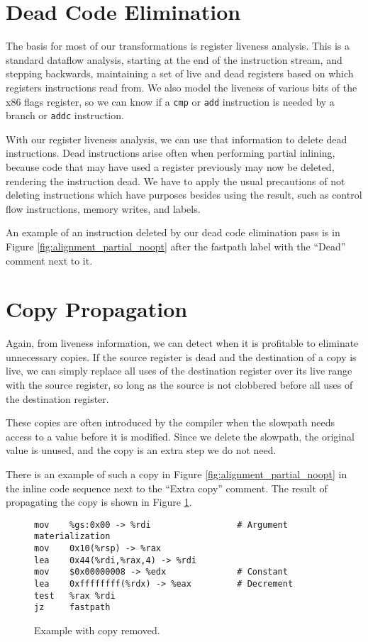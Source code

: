 \section{Dead Code Elimination}

The basis for most of our transformations is register liveness analysis.  This
is a standard dataflow analysis, starting at the end of the instruction stream,
and stepping backwards, maintaining a set of live and dead registers based on
which registers instructions read from.  We also model the liveness of various
bits of the x86 flags register, so we can know if a {\tt cmp} or {\tt add}
instruction is needed by a branch or {\tt addc} instruction.

With our register liveness analysis, we can use that information to delete dead
instructions.  Dead instructions arise often when performing partial inlining,
because code that may have used a register previously may now be deleted,
rendering the instruction dead.  We have to apply the usual precautions of not
deleting instructions which have purposes besides using the result, such as
control flow instructions, memory writes, and labels.

An example of an instruction deleted by our dead code elimination pass is in
Figure \ref{fig:alignment_partial_noopt} after the fastpath label with the ``Dead''
comment next to it.

\section{Copy Propagation}

Again, from liveness information, we can detect when it is profitable to
eliminate unnecessary copies.  If the source register is dead and the
destination of a copy is live, we can simply replace all uses of the destination
register over its live range with the source register, so long as the source is
not clobbered before all uses of the destination register.

These copies are often introduced by the compiler when the slowpath needs access
to a value before it is modified.  Since we delete the slowpath, the original
value is unused, and the copy is an extra step we do not need.

There is an example of such a copy in Figure \ref{fig:alignment_partial_noopt} in
the inline code sequence next to the ``Extra copy'' comment.  The result of
propagating the copy is shown in Figure \ref{fig:copy_propagation}.

\begin{figure}
\begin{verbatim}
mov    %gs:0x00 -> %rdi                 # Argument materialization
mov    0x10(%rsp) -> %rax
lea    0x44(%rdi,%rax,4) -> %rdi
mov    $0x00000008 -> %edx              # Constant
lea    0xffffffff(%rdx) -> %eax         # Decrement
test   %rax %rdi
jz     fastpath
\end{verbatim}
\caption{Example with copy removed.}
\label{fig:copy_propagation}
\end{figure}

